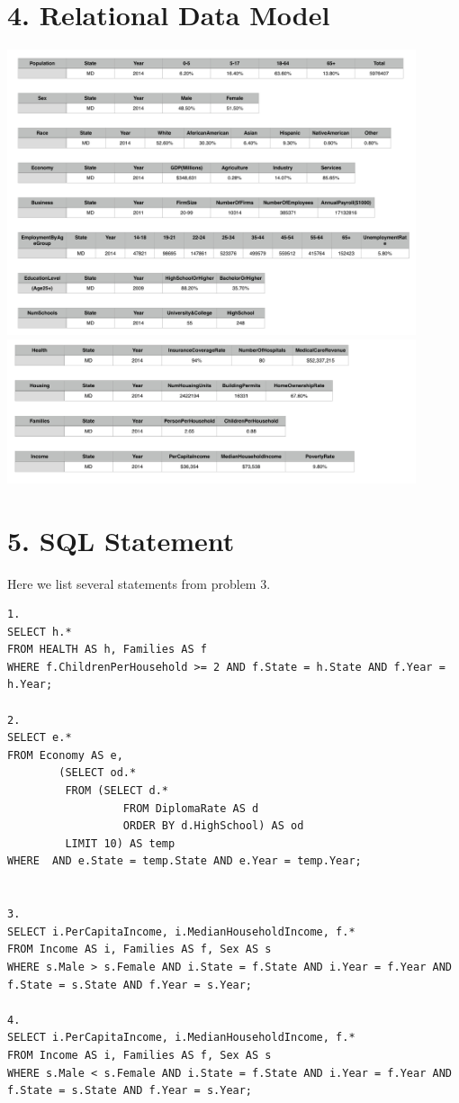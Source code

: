 \documentclass{article}
\begin{document}
\section*{4. Relational Data Model}
\begin{center}
	\includegraphics[width = 0.9\textwidth]{"1"}
	\includegraphics[width = 0.9\textwidth]{"2"}
\end{center}

\section*{5. SQL Statement}
Here we list several statements from problem 3.
\begin{lstlisting}
1.
SELECT h.*
FROM HEALTH AS h, Families AS f
WHERE f.ChildrenPerHousehold >= 2 AND f.State = h.State AND f.Year = h.Year;

2.
SELECT e.*
FROM Economy AS e, 
		(SELECT od.*
		 FROM (SELECT d.*
				  FROM DiplomaRate AS d
				  ORDER BY d.HighSchool) AS od
		 LIMIT 10) AS temp
WHERE  AND e.State = temp.State AND e.Year = temp.Year;


3.
SELECT i.PerCapitaIncome, i.MedianHouseholdIncome, f.*
FROM Income AS i, Families AS f, Sex AS s
WHERE s.Male > s.Female AND i.State = f.State AND i.Year = f.Year AND f.State = s.State AND f.Year = s.Year;

4.
SELECT i.PerCapitaIncome, i.MedianHouseholdIncome, f.*
FROM Income AS i, Families AS f, Sex AS s
WHERE s.Male < s.Female AND i.State = f.State AND i.Year = f.Year AND f.State = s.State AND f.Year = s.Year;
\end{lstlisting}
\end{document}
